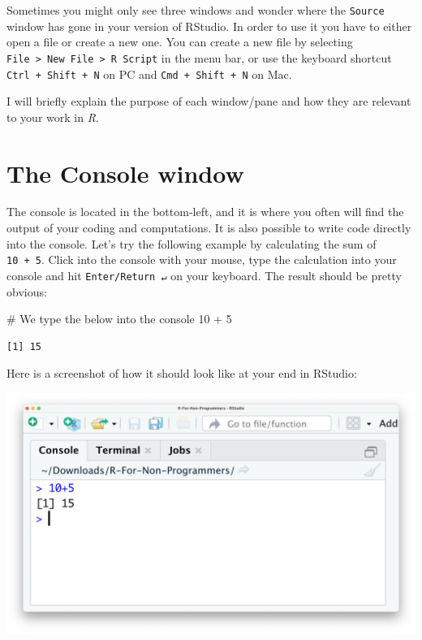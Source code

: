 \documentclass[
  letterpaper,
]{krantz}
\makeatletter
\newenvironment{Shaded}{\begin{snugshade}}{\end{snugshade}}
\newcommand{\CommentTok}[1]{\textcolor[rgb]{0.37,0.37,0.37}{#1}}
\newcommand{\DecValTok}[1]{\textcolor[rgb]{0.68,0.00,0.00}{#1}}
\newcommand{\SpecialCharTok}[1]{\textcolor[rgb]{0.37,0.37,0.37}{#1}}
\newenvironment{kframe}{%
\medskip{}
\setlength{\fboxsep}{.8em}
 \def\at@end@of@kframe{}%
 \ifinner\ifhmode%
  \def\at@end@of@kframe{\end{minipage}}%
  \begin{minipage}{\columnwidth}%
 \fi\fi%
 \def\FrameCommand##1{\hskip\@totalleftmargin \hskip-\fboxsep
 \colorbox{shadecolor}{##1}\hskip-\fboxsep
     \hskip-\linewidth \hskip-\@totalleftmargin \hskip\columnwidth}%
 \MakeFramed {\advance\hsize-\width
   \@totalleftmargin\z@ \linewidth\hsize
   \@setminipage}}%
 {\par\unskip\endMakeFramed%
 \at@end@of@kframe}
\renewenvironment{Shaded}{\begin{kframe}}{\end{kframe}}
\makeatother
\begin{document}
Sometimes you might only see three windows and wonder where the
\texttt{Source} window has gone in your version of RStudio. In order to
use it you have to either open a file or create a new one. You can
create a new file by selecting
\texttt{File\ \textgreater{}\ New\ File\ \textgreater{}\ R\ Script} in
the menu bar, or use the keyboard shortcut \texttt{Ctrl\ +\ Shift\ +\ N}
on PC and \texttt{Cmd\ +\ Shift\ +\ N} on Mac.

I will briefly explain the purpose of each window/pane and how they are
relevant to your work in \emph{R}.

\section{The Console window}\label{the-console-window}

The console is located in the bottom-left, and it is where you often
will find the output of your coding and computations. It is also
possible to write code directly into the console. Let's try the
following example by calculating the sum of \texttt{10\ +\ 5}. Click
into the console with your mouse, type the calculation into your console
and hit \texttt{Enter/Return\ ↵} on your keyboard. The result should be
pretty obvious:

\begin{Shaded}
\begin{Highlighting}[]
\CommentTok{\# We type the below into the console}
\DecValTok{10} \SpecialCharTok{+} \DecValTok{5}
\end{Highlighting}
\end{Shaded}

\begin{verbatim}
[1] 15
\end{verbatim}

Here is a screenshot of how it should look like at your end in RStudio:

\includegraphics{images/chapter_04_img/02_console_window/console_algebra.png}
\end{document}
